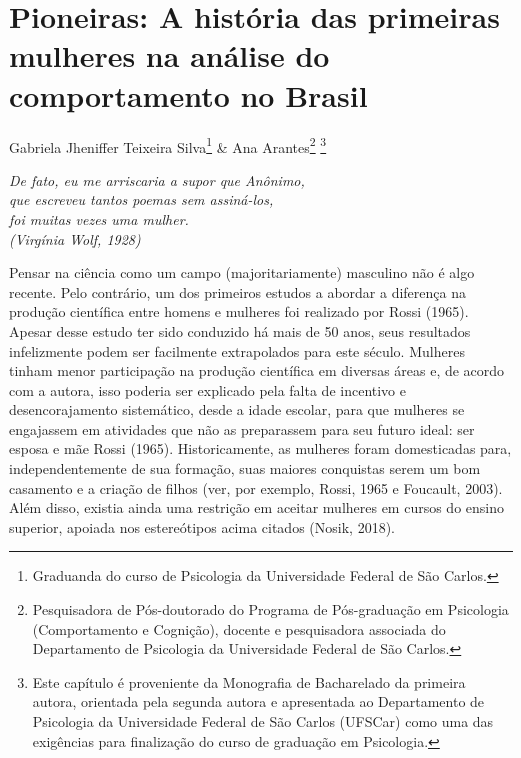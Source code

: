 \chapter{Pioneiras: A história das primeiras mulheres na análise do comportamento no Brasil}
\begin{flushright}
\begin{scriptsize}
Gabriela Jheniffer Teixeira Silva\footnote{Graduanda do curso de Psicologia da Universidade Federal de São Carlos.} \& Ana Arantes\footnote{Pesquisadora de Pós-doutorado do Programa de Pós-graduação em Psicologia (Comportamento e Cognição), docente e pesquisadora associada do Departamento de Psicologia da Universidade Federal de São Carlos.} \footnote{Este capítulo é proveniente da Monografia de Bacharelado da primeira autora, orientada pela segunda autora e apresentada ao Departamento de Psicologia da Universidade Federal de São Carlos (UFSCar) como uma das exigências para finalização do curso de graduação em Psicologia.}
\end{scriptsize}
\vspace{1cm}

\emph{De fato, eu me arriscaria a supor que Anônimo,\\
que escreveu tantos poemas sem assiná-los,\\
foi muitas vezes uma mulher.\\
(Virgínia Wolf, 1928)}
\end{flushright}

Pensar na ciência como um campo (majoritariamente) masculino não é algo recente. Pelo contrário, um dos primeiros estudos a abordar a diferença na produção científica entre homens e mulheres foi realizado por Rossi (1965). Apesar desse estudo ter sido conduzido há mais de 50 anos, seus resultados infelizmente podem ser facilmente extrapolados para este século. Mulheres tinham menor participação na produção científica em diversas áreas e, de acordo com a autora, isso poderia ser explicado pela falta de incentivo e desencorajamento sistemático, desde a idade escolar, para que mulheres se engajassem em atividades que não as preparassem para seu futuro ideal: ser esposa e mãe Rossi (1965). Historicamente, as mulheres foram domesticadas para, independentemente de sua formação, suas maiores conquistas serem um bom casamento e a criação de filhos (ver, por exemplo,  Rossi, 1965 e Foucault, 2003). Além disso, existia ainda uma restrição em aceitar mulheres em cursos do ensino superior, apoiada nos estereótipos acima citados (Nosik, 2018).


